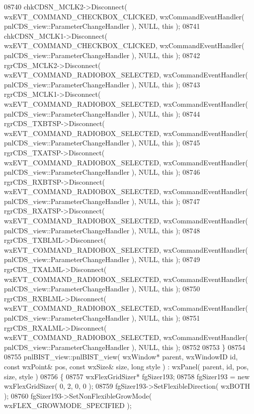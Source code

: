 \begin{DoxyCode}
08740     chkCDSN_MCLK2->Disconnect( wxEVT\_COMMAND\_CHECKBOX\_CLICKED, wxCommandEventHandler( 
      pnlCDS_view::ParameterChangeHandler ), NULL, \textcolor{keyword}{this} );
08741     chkCDSN_MCLK1->Disconnect( wxEVT\_COMMAND\_CHECKBOX\_CLICKED, wxCommandEventHandler( 
      pnlCDS_view::ParameterChangeHandler ), NULL, \textcolor{keyword}{this} );
08742     rgrCDS_MCLK2->Disconnect( wxEVT\_COMMAND\_RADIOBOX\_SELECTED, wxCommandEventHandler( 
      pnlCDS_view::ParameterChangeHandler ), NULL, \textcolor{keyword}{this} );
08743     rgrCDS_MCLK1->Disconnect( wxEVT\_COMMAND\_RADIOBOX\_SELECTED, wxCommandEventHandler( 
      pnlCDS_view::ParameterChangeHandler ), NULL, \textcolor{keyword}{this} );
08744     rgrCDS_TXBTSP->Disconnect( wxEVT\_COMMAND\_RADIOBOX\_SELECTED, wxCommandEventHandler( 
      pnlCDS_view::ParameterChangeHandler ), NULL, \textcolor{keyword}{this} );
08745     rgrCDS_TXATSP->Disconnect( wxEVT\_COMMAND\_RADIOBOX\_SELECTED, wxCommandEventHandler( 
      pnlCDS_view::ParameterChangeHandler ), NULL, \textcolor{keyword}{this} );
08746     rgrCDS_RXBTSP->Disconnect( wxEVT\_COMMAND\_RADIOBOX\_SELECTED, wxCommandEventHandler( 
      pnlCDS_view::ParameterChangeHandler ), NULL, \textcolor{keyword}{this} );
08747     rgrCDS_RXATSP->Disconnect( wxEVT\_COMMAND\_RADIOBOX\_SELECTED, wxCommandEventHandler( 
      pnlCDS_view::ParameterChangeHandler ), NULL, \textcolor{keyword}{this} );
08748     rgrCDS_TXBLML->Disconnect( wxEVT\_COMMAND\_RADIOBOX\_SELECTED, wxCommandEventHandler( 
      pnlCDS_view::ParameterChangeHandler ), NULL, \textcolor{keyword}{this} );
08749     rgrCDS_TXALML->Disconnect( wxEVT\_COMMAND\_RADIOBOX\_SELECTED, wxCommandEventHandler( 
      pnlCDS_view::ParameterChangeHandler ), NULL, \textcolor{keyword}{this} );
08750     rgrCDS_RXBLML->Disconnect( wxEVT\_COMMAND\_RADIOBOX\_SELECTED, wxCommandEventHandler( 
      pnlCDS_view::ParameterChangeHandler ), NULL, \textcolor{keyword}{this} );
08751     rgrCDS_RXALML->Disconnect( wxEVT\_COMMAND\_RADIOBOX\_SELECTED, wxCommandEventHandler( 
      pnlCDS_view::ParameterChangeHandler ), NULL, \textcolor{keyword}{this} );
08752     
08753 \}
08754 
08755 pnlBIST_view::pnlBIST_view( wxWindow* parent, wxWindowID \textcolor{keywordtype}{id}, \textcolor{keyword}{const} wxPoint& pos, \textcolor{keyword}{const} wxSize& 
      size, \textcolor{keywordtype}{long} style ) : wxPanel( parent, id, pos, size, style )
08756 \{
08757     wxFlexGridSizer* fgSizer193;
08758     fgSizer193 = \textcolor{keyword}{new} wxFlexGridSizer( 0, 2, 0, 0 );
08759     fgSizer193->SetFlexibleDirection( wxBOTH );
08760     fgSizer193->SetNonFlexibleGrowMode( wxFLEX\_GROWMODE\_SPECIFIED );

\end{DoxyCode}
